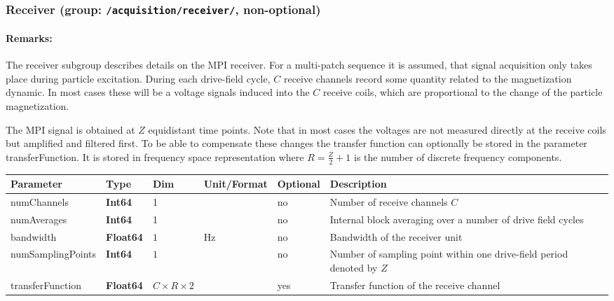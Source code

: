 \documentclass[landscape,a4paper]{article} %
\newcommand{\inl}[1]{\lstinline[columns=fixed]{#1}}
\newcommand{\inltab}[1]{{\ttfamily\bfseries\color{blue}#1}}
\newcommand{\inlvar}[1]{{\ttfamily#1}}
\begin{document}
\subsubsection{Receiver (group: \inl{/acquisition/receiver/}, non-optional)}

\begin{multicols}{2}
\paragraph{Remarks:} The receiver subgroup describes details on the MPI receiver. For a multi-patch sequence it is assumed, that signal acquisition only takes place during particle excitation. During each drive-field cycle, $C$ receive channels record some quantity related to the magnetization dynamic. In most cases these will be a voltage signals induced into the $C$ receive coils, which are proportional to the change of the particle magnetization. 

The MPI signal is obtained at $Z$ equidistant time points. Note that in most cases the voltages are not measured directly at the receive coils but amplified and filtered first. To be able to compensate these changes the transfer function can optionally be stored in the parameter \inlvar{transferFunction}. It is stored in frequency space representation where $R=\frac{Z}{2}+1$ is the number of discrete frequency components.
\end{multicols}

\noindent \begin{tabularx}{\columnwidth}{lllllX} 
\textbf{Parameter} & \textbf{Type} & \textbf{Dim} & \textbf{Unit/Format} & \textbf{Optional} & \textbf{Description} \\ \hline 
\inlvar{numChannels} & \inltab{Int64} & 1 & & no & Number of receive channels $C$ \\ \hline 
\inlvar{numAverages} & \inltab{Int64} & 1 & & no & Internal block averaging over a number of drive field cycles \\ \hline 
\inlvar{bandwidth} & \inltab{Float64} & $1$ & Hz & no & Bandwidth of the receiver unit \\ \hline
\inlvar{numSamplingPoints} & \inltab{Int64} & $1$ &  & no & Number of sampling point within one drive-field period denoted by $Z$ \\ \hline
\inlvar{transferFunction} & \inltab{Float64} & $C \times R \times 2$ &  & yes & Transfer function of the receive channel \\ \hline
\end{tabularx}
\end{document}
